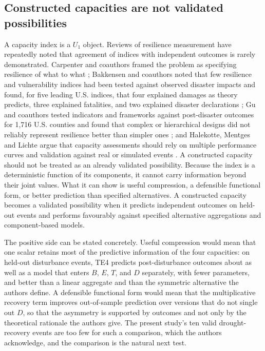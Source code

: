 \documentclass[11pt]{article}
\theoremstyle{definition}
\theoremstyle{remark}
\begin{document}
\subsection{Constructed capacities are not validated possibilities}

A capacity index is a $U_1$ object. Reviews of resilience measurement have repeatedly noted that agreement of indices with independent outcomes is rarely demonstrated. Carpenter and coauthors framed the problem as specifying resilience of what to what \cite{carpenter2001}; Bakkensen and coauthors noted that few resilience and vulnerability indices had been tested against observed disaster impacts and found, for five leading U.S. indices, that four explained damages as theory predicts, three explained fatalities, and two explained disaster declarations \cite{bakkensen2017}; Gu and coauthors tested indicators and frameworks against post-disaster outcomes for 1,716 U.S. counties and found that complex or hierarchical designs did not reliably represent resilience better than simpler ones \cite{gu2023,gu2025}; and Halekotte, Mentges and Lichte argue that capacity assessments should rely on multiple performance curves and validation against real or simulated events \cite{halekotte2024}. A constructed capacity should not be treated as an already validated possibility. Because the index is a deterministic function of its components, it cannot carry information beyond their joint values. What it can show is useful compression, a defensible functional form, or better prediction than specified alternatives. A constructed capacity becomes a validated possibility when it predicts independent outcomes on held-out events and performs favourably against specified alternative aggregations and component-based models.

The positive side can be stated concretely. Useful compression would mean that one scalar retains most of the predictive information of the four capacities: on held-out disturbance events, TE4 predicts post-disturbance outcomes about as well as a model that enters $B$, $E$, $T$, and $D$ separately, with fewer parameters, and better than a linear aggregate and than the symmetric alternative the authors define. A defensible functional form would mean that the multiplicative recovery term improves out-of-sample prediction over versions that do not single out $D$, so that the asymmetry is supported by outcomes and not only by the theoretical rationale the authors give. The present study's ten valid drought-recovery events are too few for such a comparison, which the authors acknowledge, and the comparison is the natural next test.
\end{document}
